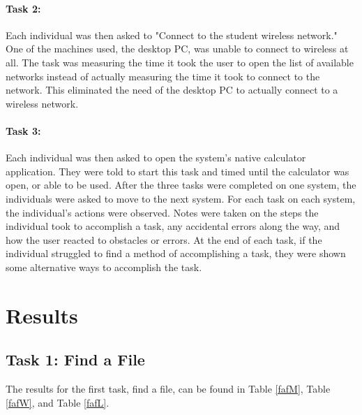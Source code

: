 \documentclass[11pt,letterpaper]{report}
\begin{document}
\paragraph{Task 2:} Each individual was then asked to "Connect to the student wireless network." One of the machines used, the desktop PC, was unable to connect to wireless at all. The task was measuring the time it took the user to open the list of available networks instead of actually measuring the time it took to connect to the network. This eliminated the need of the desktop PC to actually connect to a wireless network. 

\paragraph{Task 3:} Each individual was then asked to open the system's native calculator application. They were told to start this task and timed until the calculator was open, or able to be used. 
\vspace{5mm} %
After the three tasks were completed on one system, the individuals were asked to move to the next system. For each task on each system, the individual's actions were observed. Notes were taken on the steps the individual took to accomplish a task, any accidental errors along the way, and how the user reacted to obstacles or errors. At the end of each task, if the individual struggled to find a method of accomplishing a task, they were shown some alternative ways to accomplish the task.  

\section{Results}

\subsection{Task 1: Find a File}
The results for the first task, find a file, can be found in Table \ref{fafM}, Table \ref{fafW}, and Table \ref{fafL}. 
\end{document}
